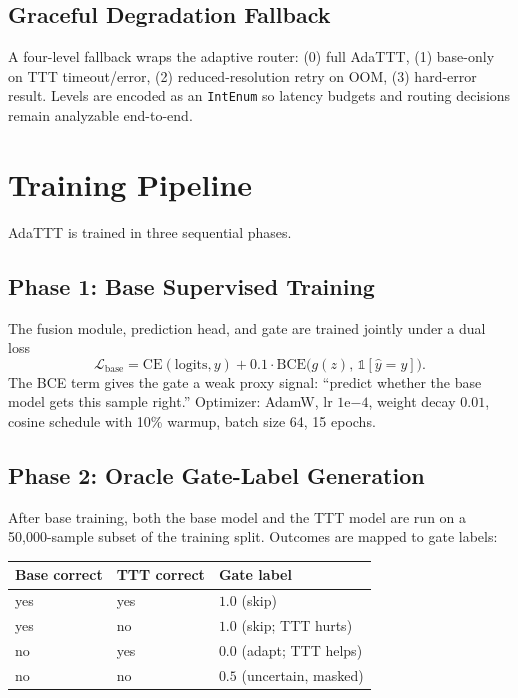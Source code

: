 \documentclass[conference]{IEEEtran}
\begin{document}
\subsection{Graceful Degradation Fallback}

A four-level fallback wraps the adaptive router:
(0) full AdaTTT, (1) base-only on TTT timeout/error,
(2) reduced-resolution retry on OOM, (3) hard-error result. Levels are
encoded as an \texttt{IntEnum} so latency budgets and routing decisions
remain analyzable end-to-end.

\section{Training Pipeline}\label{sec:training}

AdaTTT is trained in three sequential phases.

\subsection{Phase 1: Base Supervised Training}

The fusion module, prediction head, and gate are trained jointly under a
dual loss
\[
\mathcal{L}_{\mathrm{base}} = \mathrm{CE}(\mathrm{logits}, y)
+ 0.1\cdot \mathrm{BCE}\bigl(g(z),\, \mathbb{1}[\hat{y}{=}y]\bigr).
\]
The BCE term gives the gate a weak proxy signal: ``predict whether the
base model gets this sample right.'' Optimizer: AdamW, lr $1\mathrm{e}{-4}$,
weight decay $0.01$, cosine schedule with 10\% warmup, batch size 64,
15 epochs.

\subsection{Phase 2: Oracle Gate-Label Generation}

After base training, both the base model and the TTT model are run on a
50{,}000-sample subset of the training split. Outcomes are mapped to gate
labels:

\begin{center}\footnotesize
\begin{tabular}{lll}
\toprule
Base correct & TTT correct & Gate label \\
\midrule
yes & yes & $1.0$ (skip) \\
yes & no  & $1.0$ (skip; TTT hurts) \\
no  & yes & $0.0$ (adapt; TTT helps) \\
no  & no  & $0.5$ (uncertain, masked) \\
\bottomrule
\end{tabular}
\end{center}
\end{document}

